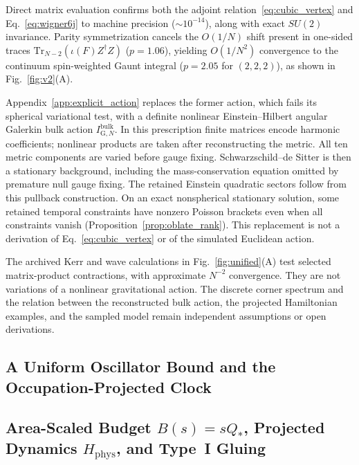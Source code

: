\documentclass[onecolumn,11pt,aps,prd,amsmath,amssymb,nofootinbib,floatfix]{revtex4-2}
\newcommand{\Tr}{\mathrm{Tr}}
\begin{document}
Direct matrix evaluation confirms both the adjoint relation~\eqref{eq:cubic_vertex} and Eq.~\eqref{eq:wigner6j} to machine precision ($\sim 10^{-14}$), along with exact $SU(2)$ invariance. Parity symmetrization cancels the $O(1/N)$ shift present in one-sided traces $\Tr_{N-2}(\iota(F)Z^\dagger Z)$ ($p=1.06$), yielding $O(1/N^2)$ convergence to the continuum spin-weighted Gaunt integral ($p=2.05$ for $(2,2,2)$), as shown in Fig.~\ref{fig:v2}(A).

Appendix~\ref{app:explicit_action} replaces the former action, which fails its spherical variational test, with a definite nonlinear Einstein--Hilbert angular Galerkin bulk action $I_{\mathrm{G},N}^{\mathrm{bulk}}$. In this prescription finite matrices encode harmonic coefficients; nonlinear products are taken after reconstructing the metric. All ten metric components are varied before gauge fixing. Schwarzschild--de Sitter is then a stationary background, including the mass-conservation equation omitted by premature null gauge fixing. The retained Einstein quadratic sectors follow from this pullback construction. On an exact nonspherical stationary solution, some retained temporal constraints have nonzero Poisson brackets even when all constraints vanish (Proposition~\ref{prop:oblate_rank}). This replacement is not a derivation of Eq.~\eqref{eq:cubic_vertex} or of the simulated Euclidean action.

The archived Kerr and wave calculations in Fig.~\ref{fig:unified}(A) test selected matrix-product contractions, with approximate $N^{-2}$ convergence. They are not variations of a nonlinear gravitational action. The discrete corner spectrum and the relation between the reconstructed bulk action, the projected Hamiltonian examples, and the sampled model remain independent assumptions or open derivations.

\subsection{A Uniform Oscillator Bound and the Occupation-Projected Clock}\label{sec:unified_clock}



\subsection{Area-Scaled Budget $B(s)=s Q_*$, Projected Dynamics $H_{\mathrm{phys}}$, and Type~I Gluing}\label{sec:unified_H}
\end{document}
